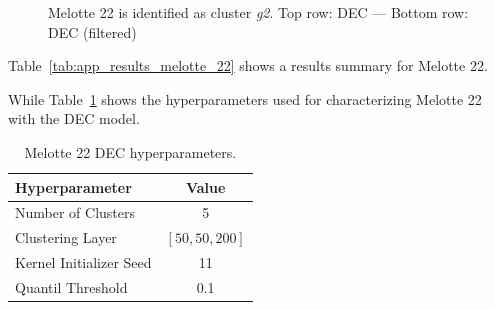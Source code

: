 \documentclass[11pt,a4paper,english,twocolumn]{article}
\begin{document}
\begin{figure}[htbp]
\begin{subfigure}{\columnwidth}
\begin{subfigure}[t]{0.30\textwidth}
    \end{subfigure}
  \end{subfigure}
  \caption{Melotte 22 is identified as cluster \emph{g2}.
           Top row: DEC --- Bottom row: DEC (filtered)}
  \label{fig:app_result_melotte_22_dec}
\end{figure}

Table~\ref{tab:app_results_melotte_22} shows a results summary for Melotte 22.

\begin{table}[htbp]
  \begin{center}
    \caption{Melotte 22 results.}
    \label{tab:app_results_melotte_22}
  \end{center}
\end{table}

While Table~\ref{tab:app_hyperparameters_melotte_22} shows the hyperparameters
used for characterizing Melotte 22 with the DEC model.

\begin{table}[hbtp]
  \begin{center}
    \begin{tabular}{l|c}
      \textbf{Hyperparameter} & \textbf{Value} \\
      \hline
      Number of Clusters & 5 \\
      Clustering Layer & \(\left[ 50, 50, 200 \right]\) \\
      Kernel Initializer Seed & 11 \\
      Quantil Threshold & 0.1 \\
    \end{tabular}
    \caption{Melotte 22 DEC hyperparameters.}
    \label{tab:app_hyperparameters_melotte_22}
  \end{center}
\end{table}

\renewcommand{\refname}{References}


\end{document}
